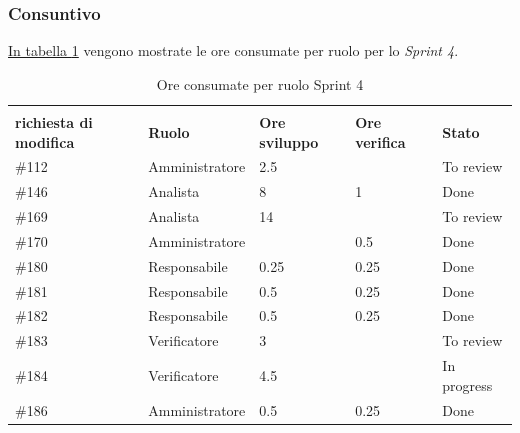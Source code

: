 \subsubsection{Consuntivo}

\hyperref[tab:sprint4_ore_consumate]{In tabella \ref{tab:sprint4_ore_consumate}} vengono mostrate le ore consumate per ruolo per lo \textit{Sprint 4}.

\begin{table}[H]
    \centering
    \begin{tabular}{| l | l | l | l | l |}
        \hline
            \makecell{\textbf{Identificativo} \\ \textbf{richiesta di modifica}} &
            \textbf{Ruolo} & 
            \textbf{Ore sviluppo} &
            \textbf{Ore verifica} & 
            \textbf{Stato}\\ 
        \hline
            \#112 & Amministratore & 2.5 & & To review\\
        \hline
            \#146 & Analista & 8 & 1 & Done\\
        \hline
            \#169 & Analista & 14 &  & To review\\
        \hline
            \#170 & Amministratore &  & 0.5 & Done \\
        \hline
            \#180 & Responsabile & 0.25 & 0.25 & Done\\
        \hline
            \#181 & Responsabile & 0.5 & 0.25 & Done\\
        \hline
            \#182 & Responsabile & 0.5 & 0.25 & Done\\
        \hline
            \#183 & Verificatore & 3 &  & To review\\
        \hline
            \#184 & Verificatore & 4.5 &  & In progress\\
        \hline
            \#186 & Amministratore & 0.5 & 0.25 & Done\\
        \hline
    \end{tabular}
    \caption{Ore consumate per ruolo Sprint 4}
    \label{tab:sprint4_ore_consumate} 
\end{table}